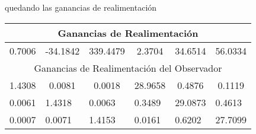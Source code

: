 quedando las ganancias de realimentación

\begin{table}[H]
\centering
\begin{tabular}{@{}clllll@{}}
\toprule
\multicolumn{6}{c}{Ganancias de Realimentación}                           \\ \midrule
0.7006 & \multicolumn{1}{c}{-34.1842} & \multicolumn{1}{c}{339.4479} & \multicolumn{1}{c}{2.3704}  & \multicolumn{1}{c}{34.6514} & \multicolumn{1}{c}{56.0334} \\ \midrule
\multicolumn{6}{c}{Ganancias de Realimentación del Observador}            \\ \midrule
1.4308 & \multicolumn{1}{c}{0.0081}   & \multicolumn{1}{c}{0.0018}   & \multicolumn{1}{c}{28.9658} & \multicolumn{1}{c}{0.4876}  & \multicolumn{1}{c}{0.1119}  \\
\multicolumn{1}{l}{0.0061} & 1.4318 & 0.0063 & 0.3489 & 29.0873 & 0.4613  \\
\multicolumn{1}{l}{0.0007} & 0.0071 & 1.4153 & 0.0161 & 0.6202  & 27.7099 \\ \bottomrule
\end{tabular}
\end{table}


%